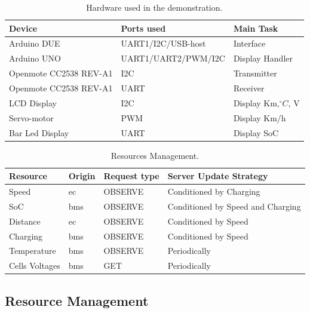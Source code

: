 \documentclass[runningheads]{llncs}
\begin{document}
\begin{table}[!t]
	\centering
	\caption{Hardware used in the demonstration.}\label{hardware}
	\begin{tabular}{|l|l|l|}
		\hline
		Device & Ports used  &  { Main Task } \\
		\hline
		
		Arduino DUE  &  { UART1/I2C/USB-host }  &  { Interface }  \\
		Arduino UNO &  { UART1/UART2/PWM/I2C } &  { Display Handler }\\
		Openmote CC2538 REV-A1 & { I2C } &  { Transmitter }\\
		Openmote CC2538 REV-A1 & { UART } &  { Receiver } \\
		LCD Display & { I2C } &  { Display Km,$^{\circ}C$, V}\\
		Servo-motor & { PWM }  &  { Display Km/h }\\
		Bar Led Display & { UART } &  { Display SoC}  \\
		\hline
		
	\end{tabular}
\end{table}

\begin{table}[!t]
	\centering
	\caption{Resources Management.}\label{resources}\label{tab:data}
	\begin{tabular}{|l|l|l|l|}
		\hline
		Resource & Origin  & Request type & Server Update Strategy\\
		\hline
		
		Speed &  \gls{ec} & OBSERVE & Conditioned by Charging \\
		SoC  & \gls{bms} & OBSERVE& Conditioned by Speed and Charging\\
		Distance & \gls{ec} & OBSERVE & Conditioned by Speed\\
		Charging & \gls{bms}  & OBSERVE & Conditioned by Speed\\
		Temperature & \gls{bms}  & OBSERVE & Periodically \\
		Cells Voltages & \gls{bms}  & GET & Periodically \\
		\hline
	\end{tabular}
\end{table}


\subsection{Resource Management}
\label{subsec:ressource-mgmt}
\end{document}
